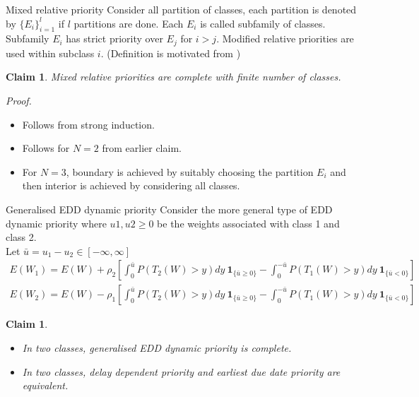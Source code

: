 \documentclass[compress, serif, onlymath, professionalfonts]{beamer}
\newtheorem{claim}[thm]{Claim}
\begin{document}
\begin{frame}{Mixed relative priority}
Consider all partition of classes, each partition is denoted by $\{E_i\}_{i=1}^l$ if $l$ partitions are done. Each $E_i$ is called subfamily of classes. Subfamily $E_i$ has strict priority over $E_j$ for $i>j$. Modified relative priorities are used within subclass $i$. (Definition is motivated from \citep{federgruen})
\begin{claim}
Mixed relative priorities are complete with finite number of classes.
\end{claim}
\textit{Proof.}\begin{itemize}
\item Follows from strong induction.
\item Follows for $N=2$ from earlier claim.
\item For $N=3$, boundary is achieved by suitably choosing the partition $E_i$ and then interior is achieved by considering all classes.    
\end{itemize}
\end{frame}
\begin{frame}{Generalised EDD dynamic priority}
Consider the more general type of EDD dynamic priority where $u1, u2 \ge 0$ be the weights associated with class 1 and class 2.\\
Let $\bar{u} = u_1 - u_2 \in [-\infty, \infty ]$
\footnotesize{ 
 \begin{eqnarray}\label{eqn:EDDcombined1}
 E(W_1) = E(W) + \rho_2\left[\int_0^{\bar{u}}P(T_2(W) > y)dy ~\mathbf{1}_{\{\bar{u} \geq 0\}} -\int_0^{-\bar{u}}P(T_1(W) > y)dy\nonumber ~\mathbf{1}_{\{\bar{u} < 0\}} \right]\\
  E(W_2) = E(W) - \rho_1\left[\int_0^{\bar{u}}P(T_2(W) > y)dy ~\mathbf{1}_{\{\bar{u} \geq 0\}} -\int_0^{-\bar{u}}P(T_1(W) > y)dy\nonumber ~\mathbf{1}_{\{\bar{u} < 0\}} \right]\label{eqn:EDDcombined2}
 \end{eqnarray}}
 \begin{claim}
\begin{itemize}
\item In two classes, generalised EDD dynamic priority is complete.
\item In two classes, delay dependent priority and earliest due date priority are equivalent.
\end{itemize}
\end{claim}
\end{frame}
\end{document}
